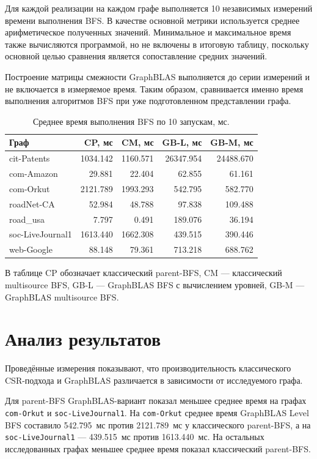 \documentclass[a4paper,10pt]{article}
\begin{document}
Для каждой реализации на каждом графе выполняется 10 независимых
измерений времени выполнения BFS. В качестве основной метрики
используется среднее арифметическое полученных значений. Минимальное
и максимальное время также вычисляются программой, но не включены в
итоговую таблицу, поскольку основной целью сравнения является
сопоставление средних значений.

Построение матрицы смежности GraphBLAS выполняется до серии измерений
и не включается в измеряемое время. Таким образом, сравнивается именно
время выполнения алгоритмов BFS при уже подготовленном представлении
графа.


\begin{table}[H]
\centering
\scriptsize
\setlength{\tabcolsep}{2.5pt}
\begin{tabular}{lrrrr}
\toprule
Граф & CP, мс & CM, мс & GB-L, мс & GB-M, мс \\
\midrule
cit-Patents & 1034.142 & 1160.571 & 26347.954 & 24488.670 \\
com-Amazon & 29.881 & 22.404 & 62.855 & 61.161 \\
com-Orkut & 2121.789 & 1993.293 & 542.795 & 582.770 \\
roadNet-CA & 52.984 & 48.788 & 97.838 & 109.488 \\
road\_usa & 7.797 & 0.491 & 189.076 & 36.194 \\
soc-LiveJournal1 & 1613.440 & 1662.308 & 439.515 & 390.446 \\
web-Google & 88.148 & 79.361 & 713.218 & 688.762 \\
\bottomrule
\end{tabular}
\caption{Среднее время выполнения BFS по 10 запускам, мс.}
\label{tab:results}
\end{table}

В таблице CP обозначает классический parent-BFS, CM --- классический
multisource BFS, GB-L --- GraphBLAS BFS с вычислением уровней, GB-M ---
GraphBLAS multisource BFS.

\section{Анализ результатов}

Проведённые измерения показывают, что производительность
классического CSR-подхода и GraphBLAS различается в зависимости от
исследуемого графа.

Для parent-BFS GraphBLAS-вариант показал меньшее среднее время на
графах \texttt{com-Orkut} и \texttt{soc-LiveJournal1}. На
\texttt{com-Orkut} среднее время GraphBLAS Level BFS составило
542.795~мс против 2121.789~мс у классического parent-BFS, а на
\texttt{soc-LiveJournal1} --- 439.515~мс против 1613.440~мс.
На остальных исследованных графах меньшее среднее время показал
классический parent-BFS.
\end{document}
